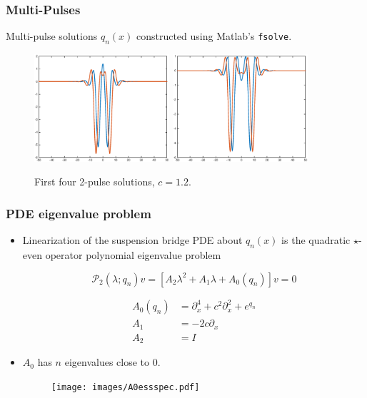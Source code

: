 \documentclass[16pt]{beamer}
\newcommand{\calP}{\mathcal{P}}
\begin{document}
\begin{frame}
\frametitle{Multi-Pulses} 
    Multi-pulse solutions $q_n(x)$ constructed using Matlab's \texttt{fsolve}.
    \begin{figure}
    \begin{center}
    \includegraphics[width=5cm]{images/double12_12.eps}
    \includegraphics[width=5cm]{images/double12_34.eps}
    \caption{First four 2-pulse solutions, $c = 1.2$.}
    \end{center}
    \end{figure}
\end{frame}

\begin{frame}
\frametitle{PDE eigenvalue problem} 

	\begin{itemize}
	\item Linearization of the suspension bridge PDE about $q_n(x)$ is the quadratic $\star$-even operator polynomial eigenvalue problem

    \[ \calP_2(\lambda; q_n)v = [A_2 \lambda^2 + A_1 \lambda + A_0(q_n)]v = 0 \]

    \begin{align*}
    A_0(q_n) &= \partial_x^4 + c^2 \partial_x^2 + e^{q_n} \\
    A_1 &= -2 c \partial_x \\
    A_2 &= I
    \end{align*}

    \item $A_0$ has $n$ eigenvalues close to 0.
        \begin{figure}
		\begin{center}
		\texttt{[image: images/A0essspec.pdf]}
		\end{center}
		\end{figure}
	\end{itemize}
\end{frame}
\end{document}
